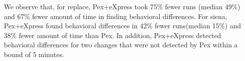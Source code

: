 %

We observe that, for replace, Pex+eXpress took 75\% fewer runs (median 49\%) and 67\% fewer amount of time in finding behavioral differences.
For siena, Pex+eXpress found behavioral differences in 42\% fewer runs(median 15\%) and 38\% fewer amount of time than Pex. In addition, Pex+eXpress detected  behavioral differences for two changes that were not detected by Pex within a bound of 5 minutes.

